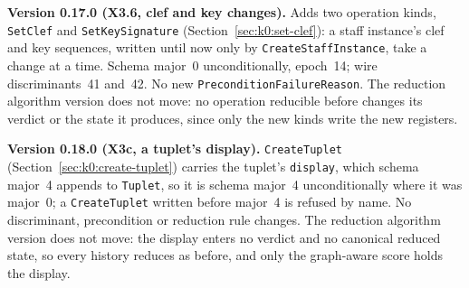 \documentclass[11pt,letterpaper]{report}
\begin{document}
\noindent\textbf{Version 0.17.0 (X3.6, clef and key changes).} Adds two
operation kinds, \texttt{SetClef} and \texttt{SetKeySignature}
(Section~\ref{sec:k0:set-clef}): a staff instance's clef and key sequences,
written until now only by \texttt{CreateStaffInstance}, take a change at a
time. Schema major~0 unconditionally, epoch~14; wire discriminants~41
and~42. No new \texttt{PreconditionFailureReason}. The reduction algorithm
version does not move: no operation reducible before changes its verdict or
the state it produces, since only the new kinds write the new registers.

\noindent\textbf{Version 0.18.0 (X3c, a tuplet's display).}
\texttt{CreateTuplet} (Section~\ref{sec:k0:create-tuplet}) carries the
tuplet's \texttt{display}, which schema major~4 appends to \texttt{Tuplet}, so
it is schema major~4 unconditionally where it was major~0; a
\texttt{CreateTuplet} written before major~4 is refused by name. No discriminant,
precondition or reduction rule changes. The reduction algorithm version does
not move: the display enters no verdict and no canonical reduced state, so
every history reduces as before, and only the graph-aware score holds the
display.
\end{document}
